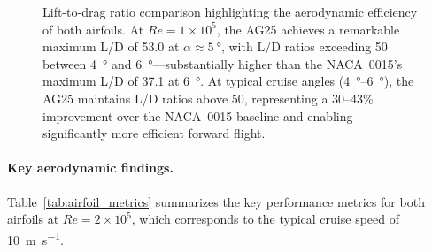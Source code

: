 \begin{figure}[htbp]
\centering

\caption{Lift-to-drag ratio comparison highlighting the aerodynamic efficiency of both airfoils. At $Re=1\times10^5$, the AG25 achieves a remarkable maximum L/D of 53.0 at $\alpha \approx \SI{5}{\degree}$, with L/D ratios exceeding 50 between \SI{4}{\degree} and \SI{6}{\degree}—substantially higher than the NACA~0015's maximum L/D of 37.1 at \SI{6}{\degree}. At typical cruise angles (\SI{4}{\degree}--\SI{6}{\degree}), the AG25 maintains L/D ratios above 50, representing a 30--43\% improvement over the NACA~0015 baseline and enabling significantly more efficient forward flight.}
\label{fig:ld_comparison}
\end{figure}

\paragraph{Key aerodynamic findings.}
Table~\ref{tab:airfoil_metrics} summarizes the key performance metrics for both airfoils at $Re=2\times10^5$, which corresponds to the typical cruise speed of \SI{10}{\meter\per\second}.

